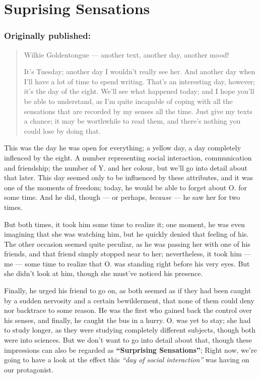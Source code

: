 \chapter{Suprising Sensations}
\label{cha:suprising-sensations}
\subsection*{Originally published: }
\begin{quote}
Wilkie Goldentongue --- another text, another day, another mood!

It's Tuesday; another day I wouldn't really see her. And another day when I'll have a lot of time to spend writing. 
That's an interesting day, however; it's the day of the eight. We'll see what happened today; and I hope you'll be able to understand, as I'm quite incapable of coping with all the sensations that are recorded by my senses all the time. 
Just give my texts a chance; it may be worthwhile to read them, and there's nothing you could lose by doing that.
\end{quote}

This was the day he was open for everything; a yellow day, a day completely inflenced by the eight. 
A number representing social interaction, communication and friendship; the number of Y. and her colour, but we'll go into detail about that later. 
This day seemed only to be influenced by these attributes, and it was one of the moments of freedom; today, he would be able to forget about O. for some time. 
And he did, though --- or perhaps, \emph{because} --- he saw her for two times.

But both times, it took him some time to realize it; one moment, he was even imagining that she was watching him, but he quickly denied that feeling of his. 
The other occasion seemed quite peculiar, as he was passing her with one of his friends, and that friend simply stopped near to her; nevertheless, it took him --- me --- some time to realize that O. was standing right before his very eyes. 
But she didn't look at him, though she must've noticed his presence.

Finally, he urged his friend to go on, as both seemed as if they had been caught by a sudden nervosity and a certain bewilderment, that none of them could deny nor backtrace to some reason. 
He was the first who gained back the control over his senses, and finally, he caught the bus in a hurry. 
O. was yet to stay; she had to study longer, as they were studying completely different subjects, though both were into sciences. 
But we don't want to go into detail about that, though these impressions can also be regarded as \textbf{\enquote{Surprising Sensations}}; Right now, we're going to have a look at the effect this \emph{\enquote{day of social interaction}} was having on our protagonist.

